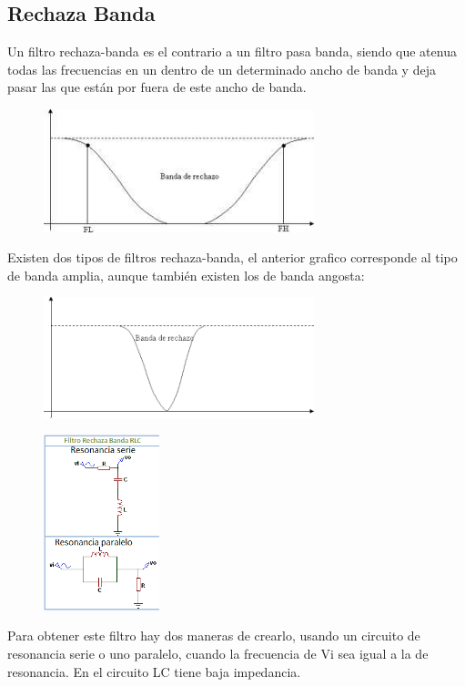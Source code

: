 \documentclass[../main.tex]{subfiles}
\begin{document}
	\subsection{Rechaza Banda}
	Un filtro rechaza-banda es el contrario a un filtro pasa banda, siendo que atenua todas las frecuencias en un dentro de un determinado ancho de banda y deja pasar las que están por fuera de este ancho de banda.
	\begin{figure}[H]
		\centering
		\includegraphics[width=0.7\textwidth]{filtros/rechaza-banda_grafico1.png}
	\end{figure}

	Existen dos tipos de filtros rechaza-banda, el anterior grafico corresponde al
	tipo de banda amplia, aunque también existen los de banda angosta:
	\begin{figure}[H]
		\centering
		\includegraphics[width=0.7\textwidth]{filtros/rechaza-banda_grafico2.png}
	\end{figure}
	
	\begin{figure}
		\includegraphics[width=0.3\textwidth]{filtros/rechaza-banda_circuito1.png}
	\end{figure}
	Para obtener este filtro hay dos maneras de crearlo, usando un circuito de resonancia serie o uno paralelo, cuando la frecuencia de Vi sea igual a la de resonancia.
	En el circuito LC tiene baja impedancia.
\end{document}
